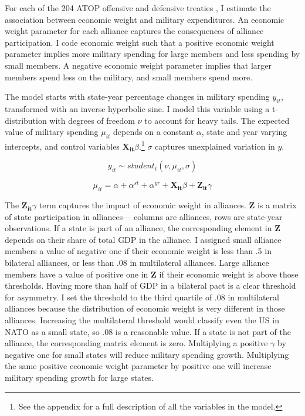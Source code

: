 \documentclass[12pt]{article}
\begin{document}
For each of the 204 ATOP offensive and defensive treaties \citep{Leedsetal2002}, I estimate the association between economic weight and military expenditures. 
An economic weight parameter for each alliance captures the consequences of alliance participation. 
I code economic weight such that a positive economic weight parameter implies more military spending for large members and less spending by small members. 
A negative economic weight parameter implies that larger members spend less on the military, and small members spend more. 


The model starts with state-year percentage changes in military spending $y_{it}$, transformed with an inverse hyperbolic sine.
I model this variable using a t-distribution with degrees of freedom $\nu$ to account for heavy tails.
The expected value of military spending $\mu_{it}$ depends on a constant $\alpha$, state and year varying intercepts, and control variables $\mathbf{X_{it}} \beta$.\footnote{See the appendix for a full description of all the variables in the model.} 
$\sigma$ captures unexplained variation in $y$. 

\begin{equation}
y_{it} \sim student_t(\nu, \mu_{it}, \sigma) 
\end{equation}

\begin{equation}
\mu_{it} = \alpha + \alpha^{st} + \alpha^{yr} + \mathbf{X_{it}} \beta + \mathbf{Z_{it}} \gamma
\end{equation}


The $\mathbf{Z_{it}} \gamma$ term captures the impact of economic weight in alliances.  
$\textbf{Z}$ is a matrix of state participation in alliances--- columns are alliances, rows are state-year observations.  
If a state is part of an alliance, the corresponding element in $\textbf{Z}$ depends on their share of total GDP in the alliance. 
I assigned small alliance members a value of negative one if their economic weight is less than .5 in bilateral alliances, or less than .08 in multilateral alliances.
Large alliance members have a value of positive one in $\textbf{Z}$ if their economic weight is above those thresholds. 
Having more than half of GDP in a bilateral pact is a clear threshold for asymmetry. 
I set the threshold to the third quartile of .08 in multilateral alliances because the distribution of economic weight is very different in those alliances. 
Increasing the multilateral threshold would classify even the US in NATO as a small state, so .08 is a reasonable value. 
If a state is not part of the alliance, the corresponding matrix element is zero. 
Multiplying a positive $\gamma$ by negative one for small states will reduce military spending growth.
Multiplying the same positive economic weight parameter by positive one will increase military spending growth for large states. 
\end{document}
